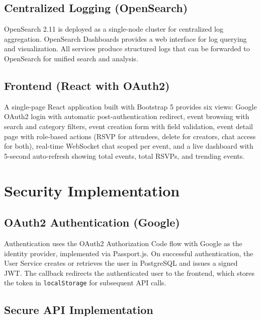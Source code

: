 \documentclass[12pt,a4paper]{article}
\begin{document}
\subsection{Centralized Logging (OpenSearch)}

OpenSearch 2.11 is deployed as a single-node cluster for centralized log aggregation. OpenSearch Dashboards provides a web interface for log querying and visualization. All services produce structured logs that can be forwarded to OpenSearch for unified search and analysis.

\subsection{Frontend (React with OAuth2)}

A single-page React application built with Bootstrap 5 provides six views: Google OAuth2 login with automatic post-authentication redirect, event browsing with search and category filters, event creation form with field validation, event detail page with role-based actions (RSVP for attendees, delete for creators, chat access for both), real-time WebSocket chat scoped per event, and a live dashboard with 5-second auto-refresh showing total events, total RSVPs, and trending events.

\newpage

\section{Security Implementation}

\subsection{OAuth2 Authentication (Google)}

Authentication uses the OAuth2 Authorization Code flow with Google as the identity provider, implemented via Passport.js. On successful authentication, the User Service creates or retrieves the user in PostgreSQL and issues a signed JWT. The callback redirects the authenticated user to the frontend, which stores the token in \texttt{localStorage} for subsequent API calls.

\subsection{Secure API Implementation}
\end{document}
